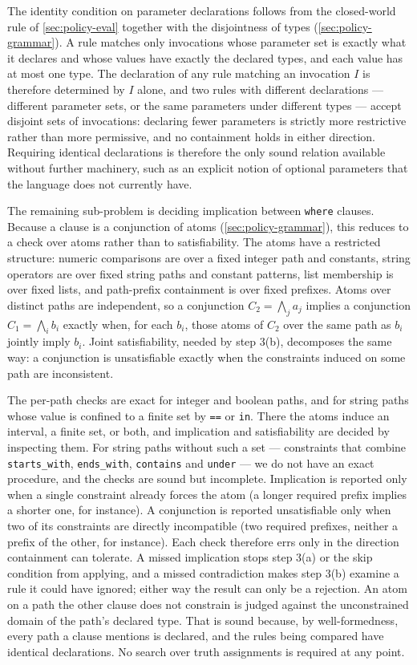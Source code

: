 \documentclass[11pt,a4paper]{article}
\begin{document}
The identity condition on parameter declarations follows from the
closed-world rule of \cref{sec:policy-eval} together with the
disjointness of types (\cref{sec:policy-grammar}). A rule matches only
invocations whose parameter set is exactly what it declares and whose
values have exactly the declared types, and each value has at most one
type. The declaration of any rule matching an invocation $I$ is
therefore determined by $I$ alone, and two rules with different
declarations --- different parameter sets, or the same parameters under
different types --- accept disjoint sets of invocations:
declaring fewer parameters is strictly more restrictive rather than more
permissive, and no containment holds in either direction. Requiring
identical declarations is therefore the only sound relation available
without further machinery, such as an explicit notion of optional
parameters that the language does not currently have.

The remaining sub-problem is deciding implication between \texttt{where}
clauses. Because a clause is a conjunction of atoms
(\cref{sec:policy-grammar}), this reduces to a check over atoms rather
than to satisfiability. The atoms have a restricted structure: numeric
comparisons are over a fixed integer path and constants, string
operators are over fixed string paths and constant patterns, list
membership is over fixed lists, and path-prefix containment is over
fixed prefixes. Atoms over distinct paths are independent, so a
conjunction $C_2 = \bigwedge_j a_j$ implies a conjunction
$C_1 = \bigwedge_i b_i$ exactly when, for each $b_i$, those atoms of
$C_2$ over the same path as $b_i$ jointly imply $b_i$. Joint
satisfiability, needed by step 3(b), decomposes the same way: a
conjunction is unsatisfiable exactly when the constraints induced on
some path are inconsistent.

The per-path checks are exact for integer and boolean paths, and for
string paths whose value is confined to a finite set by \texttt{==} or
\texttt{in}. There the atoms induce an interval, a finite set, or both,
and implication and satisfiability are decided by inspecting them. For
string paths without such a set --- constraints that combine
\texttt{starts\_with}, \texttt{ends\_with}, \texttt{contains} and
\texttt{under} --- we do not have an exact procedure, and the checks are
sound but incomplete. Implication is reported only when a single
constraint already forces the atom (a longer required prefix implies a
shorter one, for instance). A conjunction is reported unsatisfiable only
when two of its constraints are directly incompatible (two required
prefixes, neither a prefix of the other, for instance). Each check
therefore errs only in the direction containment can tolerate. A missed
implication stops step 3(a) or the skip condition from applying, and a
missed contradiction makes step 3(b) examine a rule it could have
ignored; either way the result can only be a rejection. An atom on a path
the other clause does not constrain is judged against the unconstrained
domain of the path's declared type. That is sound because, by
well-formedness, every path a clause mentions is declared, and the rules
being compared have identical declarations. No search over truth
assignments is required at any point.
\end{document}
